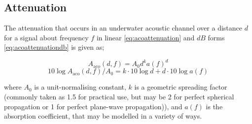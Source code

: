 \subsection{Attenuation}

The attenuation that occurs in an underwater acoustic channel over a distance $d$ for a signal about frequency $f$ in linear \eqref{eq:acoattenuation} and $dB$ forms \eqref{eq:acoattenuationdb} is given as;

\begin{equation}
  \label{eq:acoattenuation}
  A_{\text{aco}}(d,f) = A_0d^ka(f)^d
\end{equation}
\begin{equation}
  \label{eq:acoattenuationdb}
  10 \log A_{\text{aco}}(d,f)/A_0 = k \cdot 10 \log d + d \cdot 10 \log a(f)
\end{equation}

where $A_0$ is a unit-normalising constant, $k$ is a geometric spreading factor (commonly taken as 1.5 for practical use, but may be 2 for perfect spherical propagation or 1 for perfect plane-wave propagation)), and $a(f)$ is the absorption coefficient, that may be modelled in a variety of ways.

